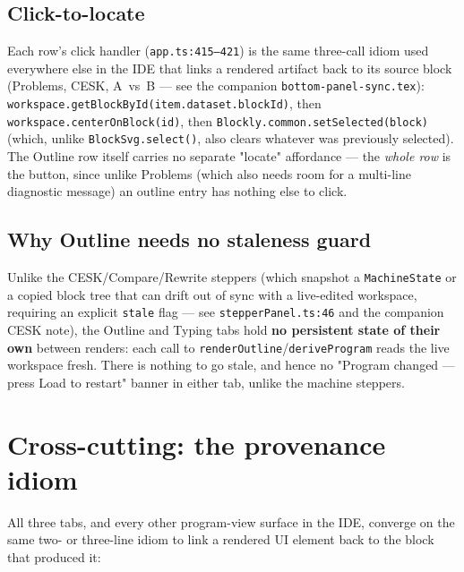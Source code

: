 \documentclass[11pt]{article}
\begin{document}
\subsection{Click-to-locate}

Each row's click handler (\texttt{app.ts:415--421}) is the same
three-call idiom used everywhere else in the IDE that links a rendered
artifact back to its source block (Problems, CESK, A~vs~B --- see the
companion \texttt{bottom-panel-sync.tex}):
\texttt{workspace.getBlockById(item.dataset.blockId)}, then
\texttt{workspace.centerOnBlock(id)}, then
\texttt{Blockly.common.setSelected(block)} (which, unlike
\texttt{BlockSvg.select()}, also clears whatever was previously selected).
The Outline row itself carries no separate "locate" affordance --- the
\emph{whole row} is the button, since unlike Problems (which also needs
room for a multi-line diagnostic message) an outline entry has nothing
else to click.

\subsection{Why Outline needs no staleness guard}

Unlike the CESK/Compare/Rewrite steppers (which snapshot a
\texttt{MachineState} or a copied block tree that can drift out of sync
with a live-edited workspace, requiring an explicit \texttt{stale} flag —
see \texttt{stepperPanel.ts:46} and the companion CESK note), the Outline
and Typing tabs hold \textbf{no persistent state of their own} between
renders: each call to \texttt{renderOutline}/\texttt{deriveProgram} reads
the live workspace fresh. There is nothing to go stale, and hence no
"Program changed --- press Load to restart" banner in either tab, unlike
the machine steppers.

\section{Cross-cutting: the provenance idiom}

All three tabs, and every other program-view surface in the IDE, converge
on the same two- or three-line idiom to link a rendered UI element back to
the block that produced it:
\end{document}
